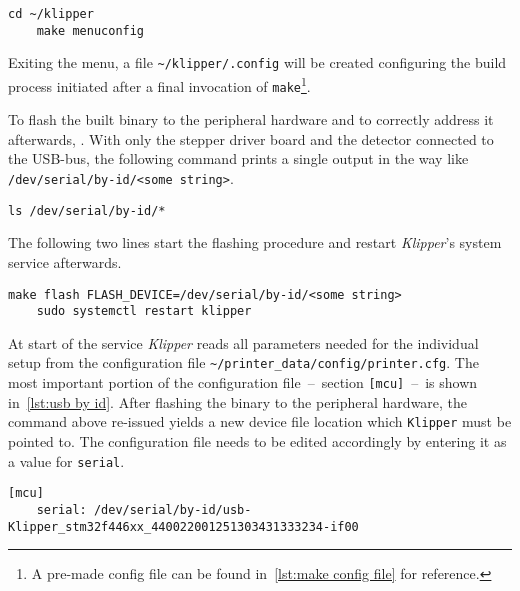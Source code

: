         \begin{lstlisting}[style=mybash, numbers=none]
    cd ~/klipper
    make menuconfig
        \end{lstlisting}

        Exiting the menu, a file \texttt{\textasciitilde/klipper/.config} will be created configuring the build process initiated after a final invocation of \texttt{make}\footnote{A pre-made config file can be found in~\cref{lst:make config file} for reference.}.\par\medskip

        To flash the built binary to the peripheral hardware and to correctly address it afterwards, . With only the stepper driver board and the detector connected to the USB-bus, the following command prints a single output in the way like \texttt{/dev/serial/by-id/<some string>}.

        \begin{lstlisting}[style=mybash, numbers=none]
    ls /dev/serial/by-id/*
        \end{lstlisting}
        
        The following two lines start the flashing procedure and restart \textit{Klipper}'s system service afterwards.
        
        \begin{lstlisting}[style=mybash, numbers=none]
    make flash FLASH_DEVICE=/dev/serial/by-id/<some string>
    sudo systemctl restart klipper
        \end{lstlisting}

        At start of the service \textit{Klipper} reads all parameters needed for the individual setup from the configuration file \texttt{\textasciitilde/printer\_data/config/printer.cfg}.
        The most important portion of the configuration file~--~section \texttt{[mcu]}~--~is shown in~\cref{lst:usb by id}.
        After flashing the binary to the peripheral hardware, the command above re-issued yields a new device file location which \texttt{Klipper} must be pointed to.
        The configuration file needs to be edited accordingly by entering it as a value for \texttt{serial}.

        \begin{lstlisting}[style=mydjango, firstnumber=7,
            caption={[\texttt{mcu}-section of \texttt{printer.cfg} showing the id of the connected serial device]\texttt{mcu}-section of the \texttt{printer.cfg} showing the id of the connected serial device.},
            label={lst:usb by id}%
            ]
    [mcu]
    serial: /dev/serial/by-id/usb-Klipper_stm32f446xx_440022001251303431333234-if00
        \end{lstlisting}

